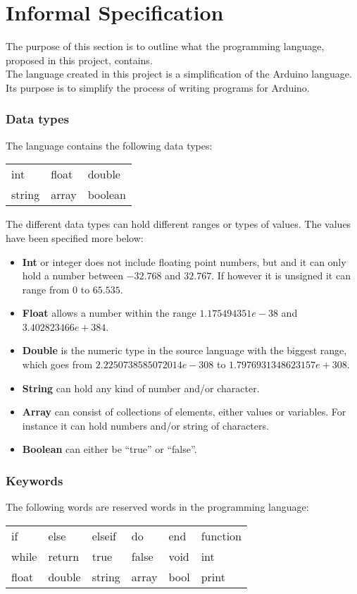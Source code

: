\chapter{Informal Specification}\label{analysis:informal-specification}
The purpose of this section is to outline what the programming language, proposed in this project, contains.
\\The language created in this project is a simplification of the Arduino language. Its purpose is to simplify the process of writing programs for Arduino.   

\subsection{Data types}
The language contains the following data types: \\ 
\begin{center}
\begin{tabular}{ l l l }
int & float & double \\
string & array & boolean \\
\end{tabular}
\end{center}
The different data types can hold different ranges or types of values. The values have been specified more below: 
\begin{itemize}
\item \textbf{Int} or integer does not include floating point numbers, but and it can only hold a number between $-32.768$ and $32.767$. If however it is unsigned it can range from $0$ to $65.535$.
\item \textbf{Float} allows a number within the range $1.175494351e-38$ and $3.402823466e+384$.
\item \textbf{Double} is the numeric type in the source language with the biggest range, which goes from $2.2250738585072014e-308$ to $1.7976931348623157e+308$.
\item \textbf{String} can hold any kind of number and/or character. 
\item \textbf{Array} can consist of collections of elements, either values or variables. For instance it can hold numbers and/or string of characters. 
\item \textbf{Boolean} can either be ``true'' or ``false''. 
\end{itemize}

\subsection{Keywords}
The following words are reserved words in the programming language:\\ 
\begin{center}
\begin{tabular}{ l l l l l l}
if & else & elseif & do & end & function \\
while & return & true & false & void & int \\
float & double & string & array & bool & print\\
\end{tabular}
\end{center}

